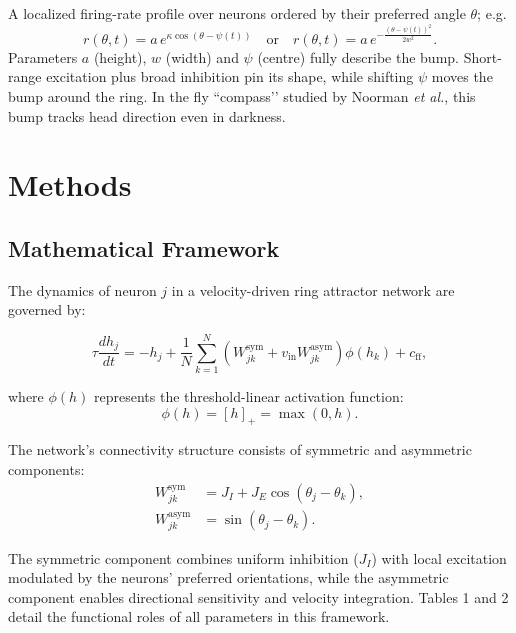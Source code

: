 \documentclass[11pt,a4paper]{article}
\begin{document}
\begin{tcolorbox}
\begin{description}[leftmargin=0pt, labelsep=1em, itemsep=0.5em]
    \item[\textcolor{blue}{\textbf{Bump of activity}}]%
        A localized firing-rate profile over neurons ordered by their preferred angle \(\theta\); e.g.
        \[
           r(\theta,t)=a\,e^{\kappa\cos(\theta-\psi(t))}
           \quad\text{or}\quad
           r(\theta,t)=a\,e^{-\frac{(\theta-\psi(t))^{2}}{2w^{2}}}.
        \]
        Parameters \(a\) (height), \(w\) (width) and \(\psi\) (centre) fully describe the bump.
        Short-range excitation plus broad inhibition pin its shape, while shifting \(\psi\) moves the bump around the ring.
        In the fly “compass’’ studied by Noorman \emph{et al.}, this bump tracks head direction even in darkness.
\end{description}

\end{tcolorbox}

\section*{Methods}
\subsection{Mathematical Framework}
The dynamics of neuron \( j \) in a velocity-driven ring attractor network are governed by:

\begin{equation}
\tau \frac{d h_j}{dt} = -h_j + \frac{1}{N} \sum_{k=1}^N \left( W^{\text{sym}}_{jk} + v_{\text{in}} W^{\text{asym}}_{jk} \right) \phi(h_k) + c_{\text{ff}},
\label{eq:ring_dynamics}
\end{equation}

where \(\phi(h)\) represents the threshold-linear activation function:
\[
\phi(h) = [h]_+ = \max(0, h).
\]

The network's connectivity structure consists of symmetric and asymmetric components:
\begin{align}
W^{\text{sym}}_{jk} &= J_I + J_E \cos(\theta_j - \theta_k), \\
W^{\text{asym}}_{jk} &= \sin(\theta_j - \theta_k).
\end{align}

The symmetric component combines uniform inhibition (\(J_I\)) with local excitation modulated by the neurons' preferred orientations, while the asymmetric component enables directional sensitivity and velocity integration. Tables 1 and 2 detail the functional roles of all parameters in this framework.
\end{document}
